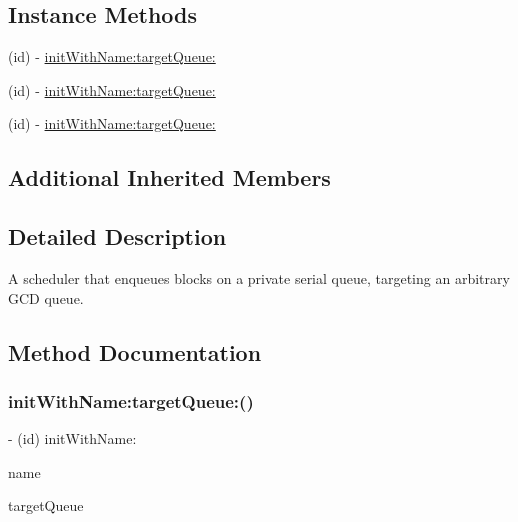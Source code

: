 \subsection*{Instance Methods}
\begin{DoxyCompactItemize}
\item 
(id) -\/ \mbox{\hyperlink{interface_r_a_c_target_queue_scheduler_af25ace578b4f013b27d616460b1a16ad}{init\+With\+Name\+:target\+Queue\+:}}
\item 
(id) -\/ \mbox{\hyperlink{interface_r_a_c_target_queue_scheduler_af25ace578b4f013b27d616460b1a16ad}{init\+With\+Name\+:target\+Queue\+:}}
\item 
(id) -\/ \mbox{\hyperlink{interface_r_a_c_target_queue_scheduler_af25ace578b4f013b27d616460b1a16ad}{init\+With\+Name\+:target\+Queue\+:}}
\end{DoxyCompactItemize}
\subsection*{Additional Inherited Members}


\subsection{Detailed Description}
A scheduler that enqueues blocks on a private serial queue, targeting an arbitrary G\+CD queue. 

\subsection{Method Documentation}
\mbox{\label{interface_r_a_c_target_queue_scheduler_af25ace578b4f013b27d616460b1a16ad}} 
\subsubsection{\texorpdfstring{init\+With\+Name\+:target\+Queue\+:()}{initWithName:targetQueue:()}\hspace{0.1cm}{\footnotesize\ttfamily [1/3]}}
{\footnotesize\ttfamily -\/ (id) init\+With\+Name\+: \begin{DoxyParamCaption}\item[{(N\+S\+String $\ast$)}]{name }\item[{targetQueue:(dispatch\+\_\+queue\+\_\+t)}]{target\+Queue }\end{DoxyParamCaption}}


